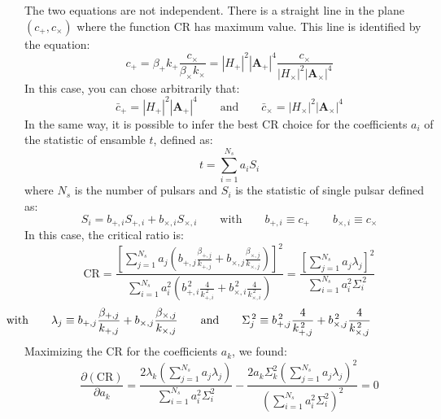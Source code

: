 \documentclass[11pt,a4paper,final]{iopart}
\begin{document}
The two equations are not independent. There is a straight line in the plane $(c_+,c_\times)$ where the function $\textrm{CR}$ has maximum value. This line is identified by the equation:
\begin{equation}\label{der}
c_+=\beta_+k_+\frac{c_\times}{\beta_\times k_\times}=|H_+|^2|\textbf{A}_+|^4\frac{c_\times}{|H_\times|^2|\textbf{A}_\times|^4}
\end{equation}
In this case, you can chose arbitrarily that:
\begin{equation}\label{chos}
\bar{c}_+=|H_+|^2|\textbf{A}_+|^4 \qquad \text{and} \qquad \bar{c}_\times=|H_\times|^2|\textbf{A}_\times|^4
\end{equation}
In the same way, it is possible to infer the best $\textrm{CR}$ choice for the coefficients $a_i$ of the statistic of ensamble $t$, defined as:
\begin{equation}
t=\sum_{i=1}^{N_s} a_i S_i
\end{equation}where $N_s$ is the number of pulsars and $S_i$ is the statistic of single pulsar defined as:
\begin{equation}
S_i=b_{+,i}S_{+,i} + b_{\times,i}S_{\times,i} \qquad \text{with} \qquad b_{+,i}\equiv c_+ \qquad b_{\times,i}\equiv c_\times
\end{equation}
In this case, the critical ratio is:
\begin{equation}
\textrm{CR}= \frac{\left[\sum_{j=1}^{N_s} a_j \left( b_{+,j} \frac{\beta_{+,j}}{k_{+,j}} + b_{\times,j} \frac{\beta_{\times,j}}{k_{\times,j}}\right)\right]^2}{\sum_{i=1}^{N_s} a_i^2 \left(b_{+,i}^{\,2} \frac{4}{k_{+,i}^{\,2}} + b_{\times,i}^{\,2} \frac{4}{k_{\times,i}^{\,2}}\right)} = \frac{\left[\sum_{j=1}^{N_s} a_j \lambda_j\right]^2}{\sum_{i=1}^{N_s} a_i^2 \Sigma_i^{\,2}}
\end{equation}
\begin{equation}
\hspace*{-2.5cm} \text{with} \qquad \lambda_j\equiv b_{+,j} \frac{\beta_{+,j}}{k_{+,j}} + b_{\times,j} \frac{\beta_{\times,j}}{k_{\times,j}} \qquad \text{and} \qquad \Sigma_j^{\,2}\equiv b_{+,j}^{\,2} \frac{4}{k_{+,j}^{\,2}} + b_{\times,j}^{\,2} \frac{4}{k_{\times,j}^{\,2}}
\end{equation}
Maximizing the $\textrm{CR}$ for the coefficients $a_k$, we found:
\begin{equation}
\frac{\partial (\textrm{CR})}{\partial a_k}=\frac{2\lambda_k\left(\sum_{j=1}^{N_s}a_j \lambda_j\right)}{\sum_{i=1}^{N_s}a_i^2\Sigma^2_i}-\frac{2a_k \Sigma_k^2\left(\sum_{j=1}^{N_s}a_j \lambda_j\right)^2}{\left(\sum_{i=1}^{N_s}a_i^2\Sigma^2_i\right)^2}=0
\end{equation}
\end{document}
